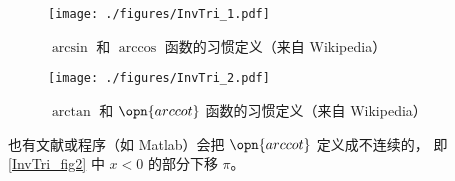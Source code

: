 
\begin{issues}
\issueDraft
\end{issues}

\begin{figure}[ht]
\centering
\texttt{[image: ./figures/InvTri\_1.pdf]}
\caption{$\arcsin$ 和 $\arccos$ 函数的习惯定义（来自 Wikipedia）} \label{InvTri_fig1}
\end{figure}

\begin{figure}[ht]
\centering
\texttt{[image: ./figures/InvTri\_2.pdf]}
\caption{$\arctan$ 和 $\opn{arccot}$ 函数的习惯定义（来自 Wikipedia）} \label{InvTri_fig2}
\end{figure}

也有文献或程序（如 Matlab）会把 $\opn{arccot}$ 定义成不连续的， 即\autoref{InvTri_fig2} 中 $x<0$ 的部分下移 $\pi$。
